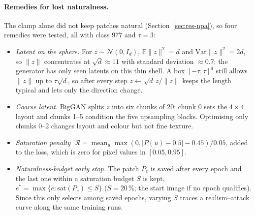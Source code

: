 \documentclass[11pt,a4paper]{article}
\begin{document}
\paragraph{Remedies for lost naturalness.} The clamp alone did not keep patches natural (Section~\ref{sec:res-npa}), so four remedies were tested, all with class 977 and $\tau=3$:
\begin{itemize}
  \item \emph{Latent on the sphere.} For $z\sim\mathcal{N}(0,I_d)$, $\mathbb{E}\lVert z\rVert^2=d$ and $\mathrm{Var}\lVert z\rVert^2=2d$, so $\lVert z\rVert$ concentrates at $\sqrt d\approx11$ with standard deviation $\approx0.7$; the generator has only seen latents on this thin shell. A box $[-\tau,\tau]^d$ still allows $\lVert z\rVert$ up to $\tau\sqrt d$, so after every step $z\leftarrow\sqrt d\,z/\lVert z\rVert$ keeps the length typical and lets only the direction change.
  \item \emph{Coarse latent.} BigGAN splits $z$ into six chunks of 20; chunk 0 sets the $4\times4$ layout and chunks 1--5 condition the five upsampling blocks. Optimising only chunks 0--2 changes layout and colour but not fine texture.
  \item \emph{Saturation penalty} $\;\mathcal{R}=\operatorname{mean}_u\max(0,|P(u)-0.5|-0.45)/0.05$, added to the loss, which is zero for pixel values in $[0.05,0.95]$.
  \item \emph{Naturalness-budget early stop.} The patch $P_e$ is saved after every epoch and the last one within a saturation budget $S$ is kept, $e^*=\max\{e:\mathrm{sat}(P_e)\le S\}$ ($S=20\,\%$; the start image if no epoch qualifies). Since this only selects among saved epochs, varying $S$ traces a realism--attack curve along the same training runs.
\end{itemize}
\end{document}
